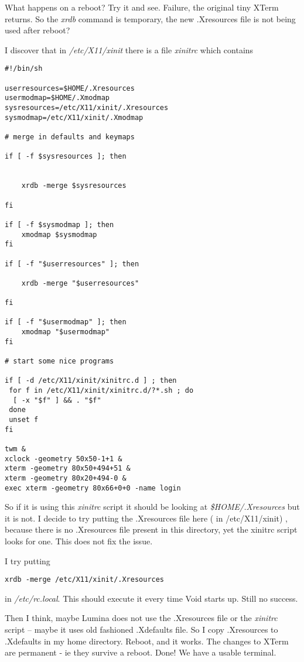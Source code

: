 \documentclass{article}  %
\begin{document}
What happens on a reboot? Try it and see. Failure, the original tiny XTerm returns. So the {\em xrdb} command is temporary, the new .Xresources file is not being used after reboot?

I discover that in {\em /etc/X11/xinit} there is a file {\em xinitrc} which contains
\begin{verbatim}
#!/bin/sh

userresources=$HOME/.Xresources
usermodmap=$HOME/.Xmodmap
sysresources=/etc/X11/xinit/.Xresources
sysmodmap=/etc/X11/xinit/.Xmodmap

# merge in defaults and keymaps

if [ -f $sysresources ]; then


    xrdb -merge $sysresources

fi

if [ -f $sysmodmap ]; then
    xmodmap $sysmodmap
fi

if [ -f "$userresources" ]; then

    xrdb -merge "$userresources"

fi

if [ -f "$usermodmap" ]; then
    xmodmap "$usermodmap"
fi

# start some nice programs

if [ -d /etc/X11/xinit/xinitrc.d ] ; then
 for f in /etc/X11/xinit/xinitrc.d/?*.sh ; do
  [ -x "$f" ] && . "$f"
 done
 unset f
fi

twm &
xclock -geometry 50x50-1+1 &
xterm -geometry 80x50+494+51 &
xterm -geometry 80x20+494-0 &
exec xterm -geometry 80x66+0+0 -name login
\end{verbatim}

So if it is using this {\em xinitrc} script it should be looking at {\em \$HOME/.Xresources} but it is not. I decide to try putting the .Xresources file here ( in /etc/X11/xinit) , because there is no .Xresources file present in this directory, yet the xinitrc script looks for one. This does not fix the issue. 

I try putting 
\begin{verbatim}
xrdb -merge /etc/X11/xinit/.Xresources 
\end{verbatim}
in {\em /etc/rc.local}. This should execute it every time Void starts up. Still no success. 

Then I think, maybe Lumina does not use the .Xresources file or the {\em xinitrc} script -- maybe it uses old fashioned .Xdefaults file. So I copy .Xresources to .Xdefaults in my home directory. Reboot, and it works. 
The changes to XTerm are permanent - ie they survive a reboot. Done! We have a usable terminal.
\end{document}
